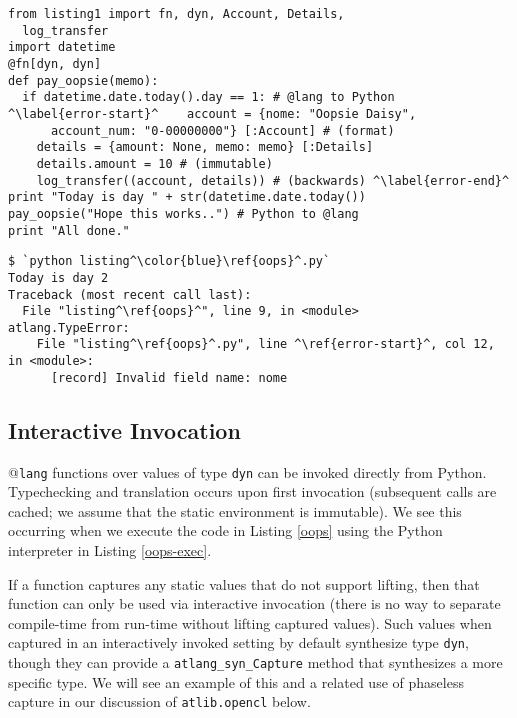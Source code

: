 \documentclass[9pt]{sigplanconf}
\newcommand{\lstinlinep}[1]{\lstinline[language=Python,basicstyle=\ttfamily\small,deletendkeywords={tuple,buffer,map}]{#1}}
\begin{document}
\begin{codelisting}[t]
\begin{lstlisting}
from listing1 import fn, dyn, Account, Details, 
  log_transfer
import datetime
@fn[dyn, dyn]
def pay_oopsie(memo):
  if datetime.date.today().day == 1: # @lang to Python
^\label{error-start}^    account = {nome: "Oopsie Daisy", 
      account_num: "0-00000000"} [:Account] # (format)
    details = {amount: None, memo: memo} [:Details]
    details.amount = 10 # (immutable)
    log_transfer((account, details)) # (backwards) ^\label{error-end}^
print "Today is day " + str(datetime.date.today())
pay_oopsie("Hope this works..") # Python to @lang
print "All done."
\end{lstlisting}
\caption{[\texttt{listing\ref{oops}.py}] Lines \ref{error-start}-\ref{error-end} each have a type error.}
\label{oops}
\end{codelisting}
\begin{codelisting}[t]
\begin{lstlisting}[style=Bash]
$ `python listing^\color{blue}\ref{oops}^.py`
Today is day 2
Traceback (most recent call last):
  File "listing^\ref{oops}^", line 9, in <module>
atlang.TypeError: 
    File "listing^\ref{oops}^.py", line ^\ref{error-start}^, col 12, in <module>: 
      [record] Invalid field name: nome
\end{lstlisting}
\caption{Execution never proceeds into a function with a type error when using @$\texttt{lang}$ for implicit compilation.}
\label{oops-exec}
\end{codelisting}

\subsection{Interactive Invocation}\label{interactive} @\texttt{lang} functions over values of type \lstinlinep{dyn} can be invoked directly from Python. Typechecking and translation occurs upon first invocation (subsequent calls are cached; we assume that the static environment is immutable). We see this occurring when we execute the code in Listing \ref{oops} using the Python interpreter in Listing \ref{oops-exec}. 

If a function captures any static values that do not support lifting, then that function can only be used via interactive invocation (there is no way to separate compile-time from run-time without lifting captured values). Such values when captured in an interactively invoked setting by default synthesize type \lstinlinep{dyn}, though they can provide a \lstinline{atlang_syn_Capture} method that synthesizes a more specific type. We will see an example of this and a related use of phaseless capture in our discussion of \lstinlinep{atlib.opencl} below.
\end{document}
